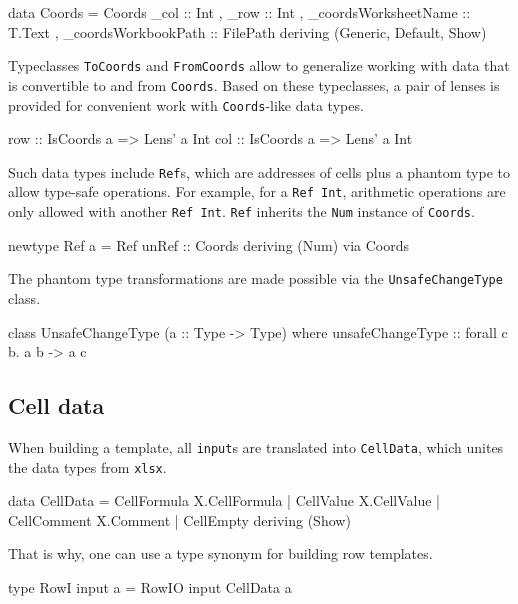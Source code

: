 \begin{mycode}
  data Coords = Coords
    { _col :: Int
      , _row :: Int
      , _coordsWorksheetName :: T.Text
      , _coordsWorkbookPath :: FilePath
    }
  deriving (Generic, Default, Show)
\end{mycode}

Typeclasses \texttt{ToCoords} and \texttt{FromCoords} allow to generalize working with data that is convertible to and from \texttt{Coords}. Based on these typeclasses, a pair of lenses is provided for convenient work with \texttt{Coords}-like data types.

\begin{mycode}
  row :: IsCoords a => Lens' a Int
  col :: IsCoords a => Lens' a Int
\end{mycode}

Such data types include \texttt{Ref}s, which are addresses of cells plus a phantom type to allow type-safe operations. For example, for a \texttt{Ref Int}, arithmetic operations are only allowed with another \texttt{Ref Int}. \texttt{Ref} inherits the \texttt{Num} instance of \texttt{Coords}.

\begin{mycode}
  newtype Ref a = Ref {unRef :: Coords}
  deriving (Num) via Coords
\end{mycode}

The phantom type transformations are made possible via the \texttt{UnsafeChangeType} class.

\begin{mycode}
  class UnsafeChangeType (a :: Type -> Type) where
  unsafeChangeType :: forall c b. a b -> a c
\end{mycode}

\subsection{Cell data}
\label{sec:celldata}

When building a template, all \texttt{input}s are translated into \texttt{CellData}, which unites the data types from \texttt{xlsx}.

\begin{mycode}
  data CellData
  = CellFormula X.CellFormula
  | CellValue X.CellValue
  | CellComment X.Comment
  | CellEmpty
  deriving (Show)
\end{mycode}

That is why, one can use a type synonym for building row templates.

\begin{mycode}
  type RowI input a = RowIO input CellData a
\end{mycode}

